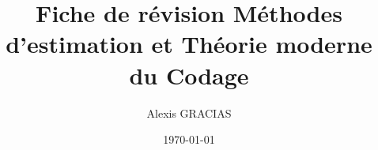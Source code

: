 \documentclass[12pt,french]{report}
\title{\Huge Fiche de révision
Méthodes d'estimation et Théorie moderne du Codage}
\author{\LARGE Alexis GRACIAS}
\date{\Large \today}
\begin{document}
\maketitle
\large \tableofcontents

\normalsize





\end{document}
